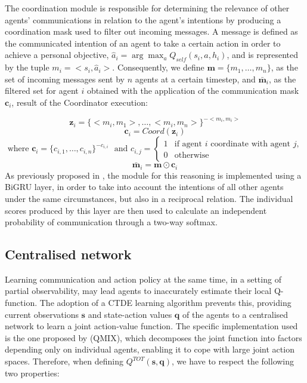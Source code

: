 \documentclass[a4paper,singleside,12pt]{report} %
\begin{document}
The coordination module is responsible for determining the relevance of other agents' communications in relation to the agent's intentions by producing a coordination mask used to filter out incoming messages. A message is defined as the communicated intention of an agent to take a certain action in order to achieve a personal objective, $\hat{a}_i=\arg\max_{a}Q_{self}(s_i,a,h_i)$, and is represented by the tuple \(m_i=<s_i,\hat{a}_i>\). Consequently, we define \(\textbf{m}=\{m_1,\dots,m_n\}\), as the set of incoming messages sent by \(n\) agents at a certain timestep, and \(\bar{\textbf{m}}_i\), as the filtered set for agent \(i\) obtained with the application of the communication mask \(\textbf{c}_i\), result of the Coordinator execution:

  \begin{equation}
    \textbf{z}_i=\{<m_i,m_1>, \dots ,<m_i,m_n>\}^{-<m_i,m_i>}
  \end{equation}
  \begin{equation}\label{eq:comm-mask}
    \textbf{c}_i=Coord(\textbf{z}_i)
  \end{equation}
  $ \text{ where } \textbf{c}_i=\{c_{i,1},\dots,c_{i,n}\}^{-c_{i,i}}$
  $\text{ and } c_{i,j}= 
    \begin{cases}
        1 & \text{if agent } i \text{ coordinate with agent } j,\\
        0 & \text{otherwise}
    \end{cases}$
  \begin{equation}\label{eq:comm-messages}
    \bar{\textbf{m}}_i=\textbf{m} \odot \textbf{c}_i
  \end{equation}
As previously proposed in \cite{ATOCJiang2018LearningAC}, the module for this reasoning is implemented using a BiGRU layer, in order to take into account the intentions of all other agents under the same circumstances, but also in a reciprocal relation. The individual scores produced by this layer are then used to calculate an independent probability of communication through a two-way softmax.

\subsection{Centralised network}\label{centralised-network}
Learning communication and action policy at the same time, in a setting of partial observability, may lead agents to inaccurately estimate their local Q-function. The adoption of a CTDE learning algorithm prevents this, providing current observations $\textbf{s}$ and state-action values $\textbf{q}$ of the agents to a centralised network to learn a joint action-value function. The specific implementation used is the one proposed by \cite{Rashid2018QMIXMV} (QMIX), which decomposes the joint function into factors depending only on individual agents, enabling it to cope with large joint action spaces. Therefore, when defining \(Q^{TOT}(\textbf{s}, \textbf{q})\), we have to respect the following two properties:
\end{document}
